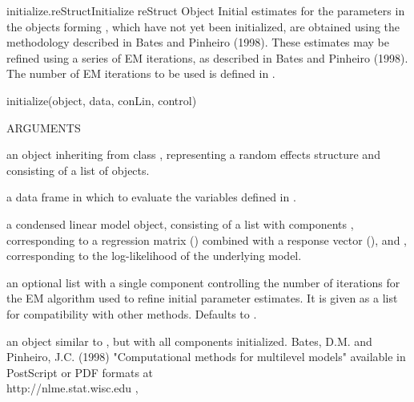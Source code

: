 \documentclass[pdftex]{article} \usepackage{url,graphicx}
\begin{document}
\begin{Helpfile}{initialize.reStruct}{Initialize reStruct Object}
Initial estimates for the parameters in the  objects
forming , which have not yet been initialized, are
obtained using the methodology described in Bates and Pinheiro
(1998). These estimates may be refined using a series of EM
iterations, as described in Bates and Pinheiro (1998). The number of
EM iterations to be used is defined in .
\begin{Example}
initialize(object, data, conLin, control)
\end{Example}
\begin{Argument}{ARGUMENTS}
\item[\Co{object:}]
an object inheriting from class ,
representing a random effects structure and consisting of a list of
 objects.
\item[\Co{data:}]
a data frame in which to evaluate the variables defined in
.
\item[\Co{conLin:}]
a condensed linear model object, consisting of a list
with components , corresponding to a regression matrix
() combined with a response vector (), and
, corresponding to the log-likelihood of the
underlying model.
\item[\Co{control:}]
an optional list with a single component 
controlling the number of iterations for the EM algorithm used to
refine initial parameter estimates. It is given as a list for
compatibility with other  methods. Defaults to
.
\end{Argument}
an  object similar to , but with all
 components initialized.
Bates, D.M. and Pinheiro, J.C. (1998) "Computational methods for
multilevel models" available in PostScript or PDF formats at \\
http://nlme.stat.wisc.edu
, 
\end{Helpfile}
\end{document}
